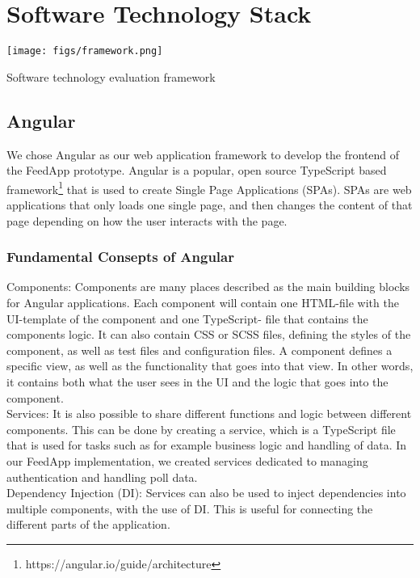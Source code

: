\clearpage
\section{Software Technology Stack}
\label{sec:technology}

\begin{center}
\texttt{[image: figs/framework.png]}
\par
Software technology evaluation framework
\end{center}

\subsection{Angular}
We chose Angular as our web application framework to develop the frontend of the FeedApp
prototype. Angular is a popular, open source TypeScript based framework\footnote{https://angular.io/guide/architecture } that is used to create
Single Page Applications (SPAs). SPAs are web applications that only loads one single page, and then
changes the content of that page depending on how the user interacts with the page.

\subsubsection{Fundamental Consepts of Angular }

\noindent Components: Components are many places described as the main building blocks for Angular applications. Each
component will contain one HTML-file with the UI-template of the component and one TypeScript-
file that contains the components logic. It can also contain CSS or SCSS files, defining the styles of the
component, as well as test files and configuration files. A component defines a specific view, as well
as the functionality that goes into that view. In other words, it contains both what the user sees in
the UI and the logic that goes into the component. \\

\noindent Services: It is also possible to share different functions and logic between different components. This
can be done by creating a service, which is a TypeScript file that is used for tasks such as for example
business logic and handling of data. In our FeedApp implementation, we created services dedicated to managing authentication and handling poll data. \\

\noindent Dependency Injection (DI): Services can also be used to inject dependencies into multiple
components, with the use of DI. This is useful for connecting the different parts of the application. \\


